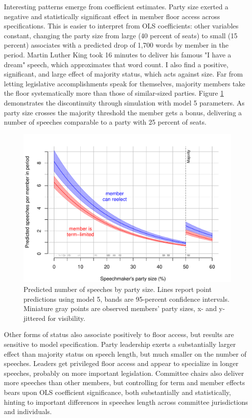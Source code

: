 \documentclass[letter,12pt]{article}
\begin{document}
Interesting patterns emerge from coefficient estimates. Party size exerted a negative and statistically significant effect in member floor access across specifications. This is easier to interpret from OLS coefficients: other variables constant, changing the party size from large (40 percent of seats) to small (15 percent) associates with a predicted drop of 1,700 words by member in the period. Martin Luther King took 16 minutes to deliver his famous "I have a dream" speech, which approximates that word count. I also find a positive, significant, and large effect of majority status, which acts against size. Far from letting legislative accomplishments speak for themselves, majority members take the floor systematically more than those of similar-sized parties. Figure \ref{F:predict} demonstrates the discontinuity through simulation with model 5 parameters. As party size crosses the majority threshold the member gets a bonus, delivering a number of speeches comparable to a party with 25 percent of seats.


\begin{figure}
  \centering
    \includegraphics[width=.67\columnwidth]{../plots/predictedWords.pdf}
    \caption{Predicted number of speeches by party size. Lines report point predictions using model 5, bands are 95-percent confidence intervals. Miniature gray points are observed members' party sizes, x- and y-jittered for visibility.}\label{F:predict}
\end{figure}

Other forms of status also associate positively to floor access, but results are sensitive to model specification. Party leadership exerts a substantially larger effect than majority status on speech length, but much smaller on the number of speeches. Leaders get privileged floor access and appear to specialize in longer speeches, probably on more important legislation. Committee chairs also deliver more speeches than other members, but controlling for term and member effects bears upon OLS coefficient significance, both substantially and statistically, hinting to important differences in speeches length across committee jurisdictions and individuals.
\end{document}
